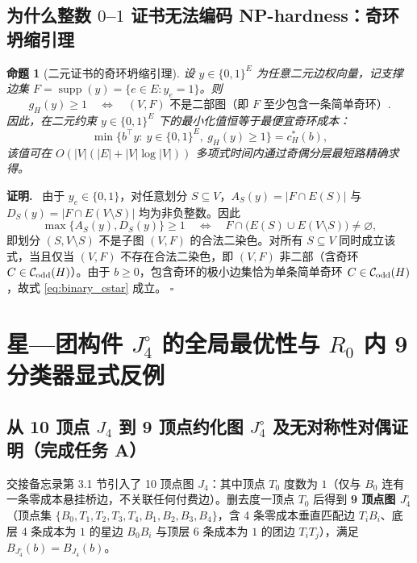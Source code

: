 \documentclass[11pt,a4paper]{ctexart}
\newtheorem{proposition}[theorem]{命题}
\theoremstyle{definition}
\newenvironment{proofcn}{\par\noindent\textbf{证明.}\ }{\hfill$\square$\par}
\newcommand{\Odd}{\mathcal C_{\rm odd}}
\newcommand{\1}{\boldsymbol 1}
\newcommand{\0}{\boldsymbol 0}
\begin{document}
\subsection{为什么整数 $0$--$1$ 证书无法编码 NP-hardness：奇环坍缩引理}
\begin{proposition}[二元证书的奇环坍缩引理]\label{prop:binary_collapse}
设 $y\in\{0,1\}^E$ 为任意二元边权向量，记支撑边集 $F=\operatorname{supp}(y)=\{e\in E:y_e=1\}$。则
\begin{equation}\label{eq:binary_iff}
 g_H(y)\ge 1 \quad\Longleftrightarrow\quad (V,F)\text{ 不是二部图（即 }F\text{ 至少包含一条简单奇环）}.
\end{equation}
因此，在二元约束 $y\in\{0,1\}^E$ 下的最小化值恒等于最便宜奇环成本：
\begin{equation}\label{eq:binary_cstar}
 \min\bigl\{b^\top y:\ y\in\{0,1\}^E,\ g_H(y)\ge 1\bigr\}=c_H^*(b),
\end{equation}
该值可在 $O(|V|(|E|+|V|\log|V|))$ 多项式时间内通过奇偶分层最短路精确求得。
\end{proposition}
\begin{proofcn}
由于 $y_e\in\{0,1\}$，对任意划分 $S\subseteq V$，$A_S(y)=|F\cap E(S)|$ 与 $D_S(y)=|F\cap E(V\setminus S)|$ 均为非负整数。因此
\[
 \max\{A_S(y),D_S(y)\}\ge 1 \quad\Longleftrightarrow\quad F\cap\bigl(E(S)\cup E(V\setminus S)\bigr)\neq\varnothing,
\]
即划分 $(S,V\setminus S)$ 不是子图 $(V,F)$ 的合法二染色。对所有 $S\subseteq V$ 同时成立该式，当且仅当 $(V,F)$ 不存在合法二染色，即 $(V,F)$ 非二部（含奇环 $C\in\Odd(H)$）。由于 $b\ge 0$，包含奇环的极小边集恰为单条简单奇环 $C\in\Odd(H)$，故式 \eqref{eq:binary_cstar} 成立。
\end{proofcn}

\section{星—团构件 $J_4^\circ$ 的全局最优性与 $R_0$ 内 9 分类器显式反例}

\subsection{从 10 顶点 $J_4$ 到 9 顶点约化图 $J_4^\circ$ 及无对称性对偶证明（完成任务 A）}
交接备忘录第 3.1 节引入了 10 顶点图 $J_4$：其中顶点 $T_0$ 度数为 $1$（仅与 $B_0$ 连有一条零成本悬挂桥边，不关联任何付费边）。删去度一顶点 $T_0$ 后得到 \textbf{9 顶点图 $J_4^\circ$}（顶点集 $\{B_0,T_1,T_2,T_3,T_4,B_1,B_2,B_3,B_4\}$，含 4 条零成本垂直匹配边 $T_iB_i$、底层 4 条成本为 $1$ 的星边 $B_0B_i$ 与顶层 6 条成本为 $1$ 的团边 $T_iT_j$），满足 $B_{J_4^\circ}(b)=B_{J_4}(b)$。
\end{document}

